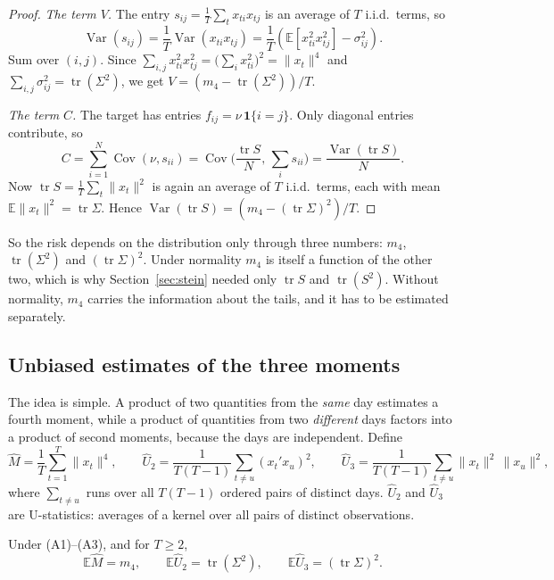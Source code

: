 \begin{proof}
\emph{The term $V$.} The entry $s_{ij} = \frac{1}{T}\sum_t x_{ti}x_{tj}$ is an average of $T$ i.i.d.\ terms, so
\[
  \operatorname{Var}(s_{ij}) = \frac{1}{T}\operatorname{Var}(x_{ti}x_{tj}) = \frac{1}{T}\left( \mathbb{E}[x_{ti}^2 x_{tj}^2] - \sigma_{ij}^2 \right).
\]
Sum over $(i,j)$. Since $\sum_{i,j}x_{ti}^2x_{tj}^2 = \big(\sum_i x_{ti}^2\big)^2 = \|x_t\|^4$ and $\sum_{i,j}\sigma_{ij}^2 = \operatorname{tr}(\Sigma^2)$, we get $V = (m_4 - \operatorname{tr}(\Sigma^2))/T$.

\emph{The term $C$.} The target has entries $f_{ij} = \nu\,\mathbf{1}\{i = j\}$. Only diagonal entries contribute, so
\[
  C = \sum_{i=1}^N \operatorname{Cov}(\nu, s_{ii})
  = \operatorname{Cov}\Big(\frac{\operatorname{tr}S}{N},\, \sum_{i} s_{ii}\Big)
  = \frac{\operatorname{Var}(\operatorname{tr}S)}{N}.
\]
Now $\operatorname{tr}S = \frac{1}{T}\sum_t \|x_t\|^2$ is again an average of $T$ i.i.d.\ terms, each with mean $\mathbb{E}\|x_t\|^2 = \operatorname{tr}\Sigma$. Hence $\operatorname{Var}(\operatorname{tr}S) = (m_4 - (\operatorname{tr}\Sigma)^2)/T$.
\end{proof}

So the risk depends on the distribution only through three numbers: $m_4$, $\operatorname{tr}(\Sigma^2)$ and $(\operatorname{tr}\Sigma)^2$. Under normality $m_4$ is itself a function of the other two, which is why Section~\ref{sec:stein} needed only $\operatorname{tr}S$ and $\operatorname{tr}(S^2)$. Without normality, $m_4$ carries the information about the tails, and it has to be estimated separately.

\subsection{Unbiased estimates of the three moments}

The idea is simple. A product of two quantities from the \emph{same} day estimates a fourth moment, while a product of quantities from two \emph{different} days factors into a product of second moments, because the days are independent. Define
\[
  \hat M = \frac{1}{T}\sum_{t=1}^T \|x_t\|^4, \qquad
  \hat U_2 = \frac{1}{T(T-1)}\sum_{t \ne u}(x_t'x_u)^2, \qquad
  \hat U_3 = \frac{1}{T(T-1)}\sum_{t \ne u}\|x_t\|^2\,\|x_u\|^2,
\]
where $\sum_{t \ne u}$ runs over all $T(T-1)$ ordered pairs of distinct days. $\hat U_2$ and $\hat U_3$ are U-statistics: averages of a kernel over all pairs of distinct observations.

\begin{proposition}\label{prop:df-unbiased}
Under (A1)--(A3), and for $T \ge 2$,
\[
  \mathbb{E}\hat M = m_4, \qquad \mathbb{E}\hat U_2 = \operatorname{tr}(\Sigma^2), \qquad \mathbb{E}\hat U_3 = (\operatorname{tr}\Sigma)^2 .
\]
\end{proposition}


